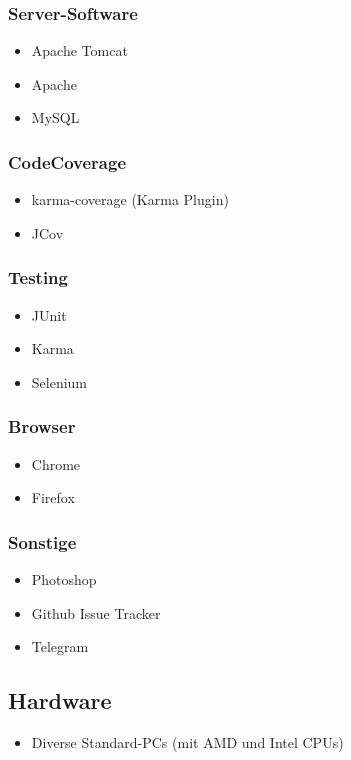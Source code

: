 	\subsubsection{Server-Software}
		\begin{itemize}
			\item Apache Tomcat
			\item Apache
			\item MySQL
		\end{itemize}
	\subsubsection{CodeCoverage}
		\begin{itemize}
			\item karma-coverage (Karma Plugin)
			\item JCov
		\end{itemize}
	\subsubsection{Testing}
		\begin{itemize}
			\item JUnit
			\item Karma
			\item Selenium
		\end{itemize}
	\subsubsection{Browser}
	\begin{itemize}
		\item Chrome
		\item Firefox
	\end{itemize}
	\subsubsection{Sonstige}
		\begin{itemize}
			\item Photoshop
			\item Github Issue Tracker
			\item Telegram
		\end{itemize}
\subsection{Hardware}
		\begin{itemize}
			\item Diverse Standard-PCs (mit AMD und Intel CPUs)
		\end{itemize}
